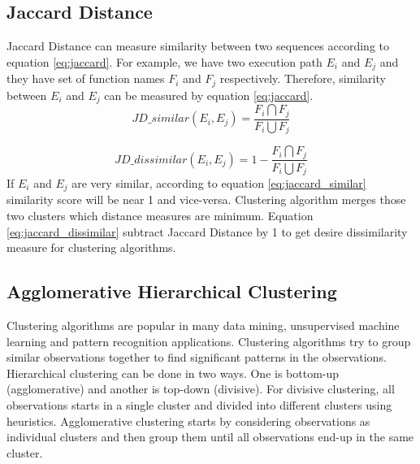 \subsection{Jaccard Distance}
\label{background:JD}
Jaccard Distance can measure similarity between two sequences according to equation \ref{eq:jaccard}. For example, we have two execution path $E_i$ and $E_j$ and they have set of function names $F_i$ and $F_j$ respectively. Therefore, similarity between $E_i$ and $E_j$ can be measured by equation \ref{eq:jaccard}. 
\begin{equation}
\label{eq:jaccard_similar}
    JD\_similar(E_i, E_j) =  \frac{F_i \bigcap F_j}{F_i \bigcup F_j}
\end{equation}

\begin{equation}
\label{eq:jaccard_dissimilar}
    JD\_dissimilar(E_i, E_j) =  1 - \frac{F_i \bigcap F_j}{F_i \bigcup F_j}
\end{equation}
If $E_i$ and $E_j$ are very similar, according to equation \ref{eq:jaccard_similar} similarity score will be near 1 and vice-versa. Clustering algorithm merges those two clusters which distance measures are minimum. Equation \ref{eq:jaccard_dissimilar} subtract Jaccard Distance by 1 to get desire dissimilarity measure for clustering algorithms.

\subsection{Agglomerative Hierarchical Clustering}
\label{background:AHC}
Clustering algorithms are popular in many data mining, unsupervised machine learning and pattern recognition applications. Clustering algorithms try to group similar observations together to find significant patterns in the observations. Hierarchical clustering can be done in two ways. One is bottom-up (agglomerative) and another is top-down (divisive). For divisive clustering, all observations starts in a single cluster and divided into different clusters using heuristics. Agglomerative clustering starts by considering observations as individual clusters and then group them until all observations end-up in the same cluster.

